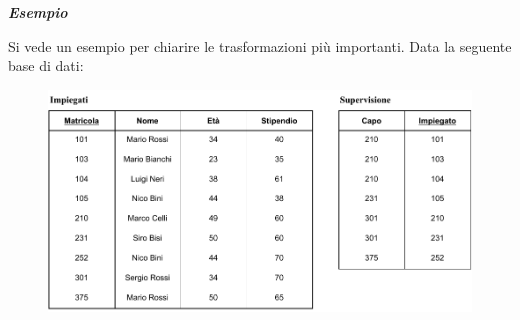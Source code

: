 \documentclass[a4paper]{article}
\begin{document}
	\noindent
	\textcolor{Green4}{\textbf{\emph{Esempio}}}\newline
	
	\noindent
	Si vede un esempio per chiarire le trasformazioni più importanti. Data la seguente base di dati:
	\begin{figure}[!htp]
		\centering
		\includegraphics[width=\textwidth]{img/equivalenza_espressioni_algebriche.pdf}
		\label{img: Trasformazioni di equivalenza - Tabella}
	\end{figure}
	
\end{document}
